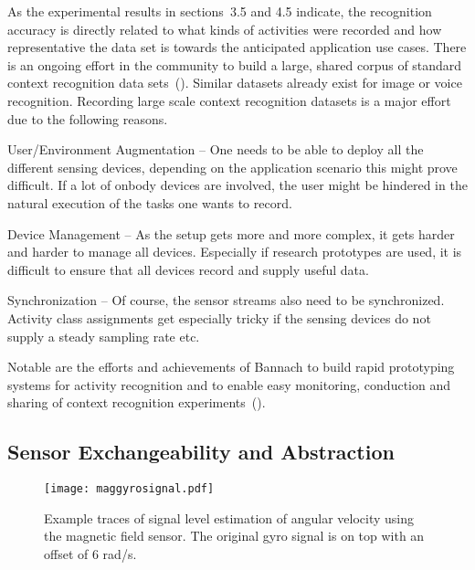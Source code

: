 As the experimental results in sections~3.5 and 4.5 indicate, the
recognition accuracy is directly related to what kinds of activities
were recorded and how representative the data set is towards the
anticipated application use cases. There is an
ongoing effort in the community to build a large, shared corpus of
standard context recognition data sets~(\cite{5573462}).
Similar datasets already exist for image or voice recognition.
Recording large scale context recognition datasets 
is a major effort due to the following reasons.
\begin{description}
\item{User/Environment Augmentation} -- One needs to be able to deploy
all the different sensing devices, depending on the application scenario
this might prove difficult. If a lot of onbody devices are involved,
the user might be hindered in the natural execution of the tasks one wants to record.
\item{Device Management} -- As the setup gets more and more complex,
it gets harder and harder to manage all devices. Especially if research
prototypes are used, it is difficult to ensure that all devices record
and supply useful data.
\item{Synchronization} -- Of course, the sensor streams also need to be
synchronized. Activity class assignments get especially tricky if
the sensing devices do not supply a steady sampling rate etc. 
\end{description}

Notable are the efforts and
achievements of Bannach to build rapid prototyping systems for
activity recognition and to enable easy monitoring, conduction and
sharing of context recognition
experiments~(\cite{Bannach:2010wt,Bannach:2008vl}). 

\subsection{Sensor Exchangeability and Abstraction}

\begin{figure}[t]
  \begin{center}
  \texttt{[image: maggyrosignal.pdf]}
	\end{center}
  \caption[Estimated gyro signal]{Example traces of signal level estimation of angular
   velocity using the magnetic field sensor. The original gyro
   signal is on top with an offset of 6
   rad/s.} \label{fig:gyromag} \end{figure}

